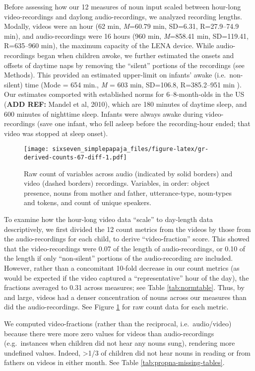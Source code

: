 \documentclass[floatsintext,man]{apa6}
\theoremstyle{definition}
\theoremstyle{definition}
\theoremstyle{definition}
\theoremstyle{remark}
\begin{document}
Before assessing how our 12 measures of noun input scaled between
hour-long video-recordings and daylong audio-recordings, we analyzed
recording lengths. Modally, videos were an hour (62 min, \emph{M}=60.79
min, SD=6.31, R=27.9--74.9 min), and audio-recordings were 16 hours (960
min, \emph{M}=858.41 min, SD=119.41, R=635--960 min), the maximum
capacity of the LENA device. While audio-recordings began when children
awoke, we further estimated the onsets and offsets of daytime naps by
removing the \enquote{silent} portions of the recordings (see Methods).
This provided an estimated upper-limit on infants' awake
(i.e.~non-silent) time (Mode = 654 min., \emph{M} = 603 min, SD=106.8,
R=385.2--951 min ). Our estimates comported with established norms for
6--8-month-olds in the US (\textbf{ADD REF:} Mandel et al, 2010), which
are 180 minutes of daytime sleep, and 600 minutes of nighttime sleep.
Infants were always awake during video-recordings (save one infant, who
fell asleep before the recording-hour ended; that video was stopped at
sleep onset).

\begin{figure}
\centering
\texttt{[image: sixseven\_simplepapaja\_files/figure-latex/gr-derived-counts-67-diff-1.pdf]}
\caption{\label{fig:gr-derived-counts-67-diff}Raw count of variables across
audio (indicated by solid borders) and video (dashed borders)
recordings. Variables, in order: object presence, nouns from mother and
father, utterance-type, noun-types and tokens, and count of unique
speakers.}
\end{figure}

To examine how the hour-long video data \enquote{scale} to day-length
data descriptively, we first divided the 12 count metrics from the
videos by those from the audio-recordings for each child, to derive
\enquote{video-fraction} score. This showed that the video-recordings
were 0.07 of the length of audio-recordings, or 0.10 of the length if
only \enquote{non-silent} portions of the audio-recording are included.
However, rather than a concomitant 10-fold decrease in our count metrics
(as would be expected if the video captured a \enquote{representative}
hour of the day), the fractions averaged to 0.31 across measures; see
Table \ref{tab:normtable}. Thus, by and large, videos had a denser
concentration of nouns across our measures than did the
audio-recordings. See Figure \ref{fig:gr-derived-counts-67-diff} for raw
count data for each metric.

We computed video-fractions (rather than the reciprocal,
i.e.~audio/video) because there were more zero values for videos than
audio-recordings (e.g.~instances when children did not hear any nouns
sung), rendering more undefined values. Indeed, \textgreater{}1/3 of
children did not hear nouns in reading or from fathers on videos in
either month. See Table \ref{tab:propna-missing-tables}.
\end{document}
